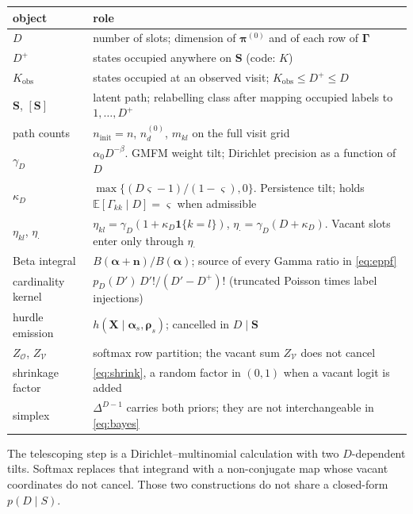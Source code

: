 \documentclass[11pt,a4paper]{article}
\newcommand{\bs}{\boldsymbol}
\newcommand{\E}{\mathbb{E}}
\newcommand{\bGamma}{\boldsymbol{\Gamma}}
\newcommand{\Dplus}{D^{+}}
\newcommand{\gammaD}{\gamma_{D}}
\newcommand{\kapD}{\kappa_{D}}
\newcommand{\etadot}{\eta_{\boldsymbol{\cdot}}}
\newcommand{\indic}[1]{\mathbf{1}\{#1\}}
\newcommand{\simplex}{\Delta}
\newcommand{\balpha}{\boldsymbol{\alpha}}
\newcommand{\brho}{\boldsymbol{\rho}}
\theoremstyle{plain}
\theoremstyle{definition}
\theoremstyle{remark}
\begin{document}
\begin{center}
\small\renewcommand{\arraystretch}{1.18}
\begin{tabular}{@{}>{\raggedright\arraybackslash}p{3.15cm}
                >{\raggedright\arraybackslash}p{11.65cm}@{}}
\toprule
object & role \\
\midrule
$D$ &
  number of slots; dimension of $\bs\pi^{(0)}$ and of each row of $\bGamma$ \\
$\Dplus$ &
  states occupied anywhere on $\bs S$ (code: $K$) \\
$K_{\mathrm{obs}}$ &
  states occupied at an observed visit; $K_{\mathrm{obs}}\le\Dplus\le D$ \\
$\bs S$, $[\bs S]$ &
  latent path; relabelling class after mapping occupied labels to $1,\dots,\Dplus$ \\
path counts &
  $n_{\mathrm{init}}=n$, $n^{(0)}_d$, $m_{kl}$ on the full visit grid \\
$\gammaD$ &
  $\alpha_0 D^{-\beta}$. GMFM weight tilt; Dirichlet precision as a function of $D$ \\
$\kapD$ &
  $\max\{(D\varsigma-1)/(1-\varsigma),0\}$. Persistence tilt; holds
  $\E[\Gamma_{kk}\mid D]=\varsigma$ when admissible \\
$\eta_{kl}$, $\etadot$ &
  $\eta_{kl}=\gammaD(1+\kapD\indic{k=l})$, $\etadot=\gammaD(D+\kapD)$.
  Vacant slots enter only through $\etadot$ \\
Beta integral &
  $B(\bs\alpha+\bs n)/B(\bs\alpha)$; source of every Gamma ratio in \eqref{eq:eppf} \\
cardinality kernel &
  $p_D(D')\,D'!/(D'-\Dplus)!$ (truncated Poisson times label injections) \\
hurdle emission &
  $h(\bs X\mid\balpha_s,\brho_s)$; cancelled in $D\mid\bs S$ \\
$Z_{\mathcal O}$, $Z_{\mathcal V}$ &
  softmax row partition; the vacant sum $Z_{\mathcal V}$ does not cancel \\
shrinkage factor &
  \eqref{eq:shrink}, a random factor in $(0,1)$ when a vacant logit is added \\
simplex &
  $\simplex^{D-1}$ carries both priors; they are not interchangeable in \eqref{eq:bayes} \\
\bottomrule
\end{tabular}
\end{center}

\vspace{0.8em}
\noindent
The telescoping step is a Dirichlet--multinomial calculation with two
$D$-dependent tilts. Softmax replaces that integrand with a non-conjugate
map whose vacant coordinates do not cancel. Those two constructions do not
share a closed-form $p(D\mid S)$.
\end{document}
